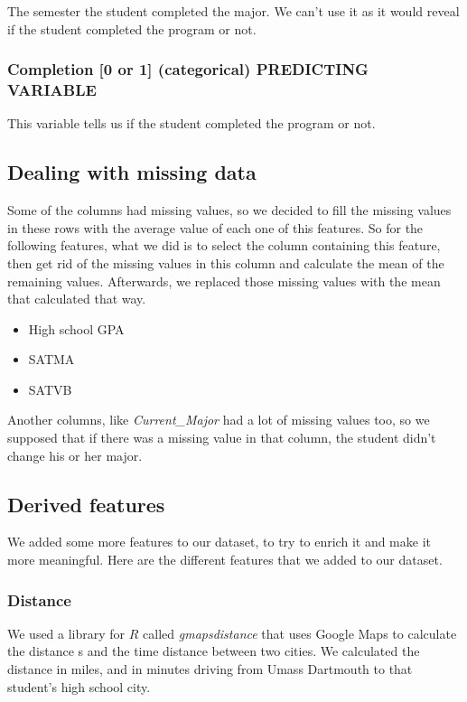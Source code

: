 \documentclass{article}
\begin{document}
The semester the student completed the major. We can't use it as it would reveal if the student completed the program or not.

\subsubsection*{Completion [0 or 1] (categorical) PREDICTING VARIABLE}

This variable tells us if the student completed the program or not.


\subsection*{Dealing with missing data}

Some of the columns had missing values, so we decided to fill the missing values in these rows with the average value of each one of this features. So for the following features, what we did is to select the column containing this feature, then get rid of the missing values in this column and calculate the mean of the remaining values. Afterwards, we replaced those missing values with the mean that calculated that way.

\begin{itemize}
 \item High school GPA
 \item SATMA
 \item SATVB
\end{itemize}

Another columns, like \textit{Current\_Major} had a lot of missing values too, so we supposed that if there was a missing value in that column, the student didn't change his or her major.

\subsection*{Derived features}

We added some more features to our dataset, to try to enrich it and make it more meaningful. Here are the different features that we added to our dataset.

\subsubsection*{Distance}

We used a library for $R$ called \textit{gmapsdistance} that uses Google Maps to calculate the distance s and the time distance between two cities. We calculated the distance in miles, and in minutes driving from Umass Dartmouth to that student's high school city.
\end{document}

